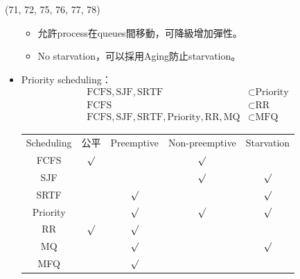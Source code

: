 \begin{theorem}{(71, 72, 75, 76, 77, 78)}
\begin{itemize}
\begin{itemize}
            \item 允許process在queues間移動，可降級增加彈性。
            \item No starvation，可以採用Aging防止starvation。
        \end{itemize}
        \item Priority scheduling：\begin{equation}
            \begin{aligned}
                \text{FCFS}, \text{SJF}, \text{SRTF} & \subset \text{Priority} \\
                \text{FCFS} & \subset \text{RR} \\
                \text{FCFS}, \text{SJF}, \text{SRTF}, \text{Priority}, \text{RR}, \text{MQ} & \subset \text{MFQ}
            \end{aligned}
        \end{equation}
        \begin{table}[H]
            \centering
            \begin{tabular}{|c|c|c|c|c|}
                \hline
                Scheduling & 公平 & Preemptive & Non-preemptive & Starvation \\
                \Xhline{2\arrayrulewidth}
                FCFS & $\surd$ & & $\surd$ & \\
                \hline
                SJF & & & $\surd$ & $\surd$ \\
                \hline
                SRTF & & $\surd$ & & $\surd$ \\
                \hline
                Priority & & $\surd$ & $\surd$ & $\surd$\\
                \hline
                RR & $\surd$ & $\surd$ & & \\
                \hline
                MQ & & $\surd$ & & $\surd$ \\
                \hline
                MFQ & & $\surd$ & & \\
                \hline
            \end{tabular}
        \end{table}
    \end{itemize}
\end{theorem}


